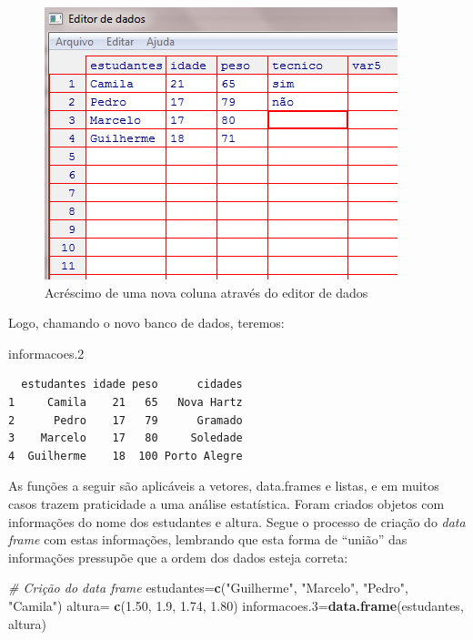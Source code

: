 \documentclass[12pt,brazil,oneside]{book}
\newenvironment{Shaded}{\begin{snugshade}}{\end{snugshade}}
\newcommand{\CommentTok}[1]{\textcolor[rgb]{0.56,0.35,0.01}{\textit{#1}}}
\newcommand{\FloatTok}[1]{\textcolor[rgb]{0.00,0.00,0.81}{#1}}
\newcommand{\KeywordTok}[1]{\textcolor[rgb]{0.13,0.29,0.53}{\textbf{#1}}}
\newcommand{\NormalTok}[1]{#1}
\newcommand{\StringTok}[1]{\textcolor[rgb]{0.31,0.60,0.02}{#1}}
\begin{document}
\begin{figure}[H]

{\centering \includegraphics[width=0.7\linewidth]{10} 

}

\caption{Acréscimo de uma nova coluna através do editor de dados}\label{fig:10}
\end{figure}

Logo, chamando o novo banco de dados, teremos:

\begin{Shaded}
\begin{Highlighting}[]
\NormalTok{informacoes}\FloatTok{.2} 
\end{Highlighting}
\end{Shaded}

\begin{verbatim}
  estudantes idade peso      cidades
1     Camila    21   65   Nova Hartz
2      Pedro    17   79      Gramado
3    Marcelo    17   80     Soledade
4  Guilherme    18  100 Porto Alegre
\end{verbatim}

As funções a seguir são aplicáveis a vetores, data.frames e listas, e em muitos casos trazem praticidade a uma análise estatística. Foram criados objetos com informações do nome dos estudantes e altura. Segue o processo de criação do \emph{data frame} com estas informações, lembrando que esta forma de ``união'' das informações pressupõe que a ordem dos dados esteja correta:

\begin{Shaded}
\begin{Highlighting}[]
\CommentTok{# Crição do data frame}
\NormalTok{estudantes=}\KeywordTok{c}\NormalTok{(}\StringTok{"Guilherme"}\NormalTok{, }\StringTok{"Marcelo"}\NormalTok{, }\StringTok{"Pedro"}\NormalTok{, }\StringTok{"Camila"}\NormalTok{)}
\NormalTok{altura=}\StringTok{ }\KeywordTok{c}\NormalTok{(}\FloatTok{1.50}\NormalTok{, }\FloatTok{1.9}\NormalTok{, }\FloatTok{1.74}\NormalTok{, }\FloatTok{1.80}\NormalTok{)}
\NormalTok{informacoes}\FloatTok{.3}\NormalTok{=}\KeywordTok{data.frame}\NormalTok{(estudantes, altura)}
\end{Highlighting}
\end{Shaded}
\end{document}
